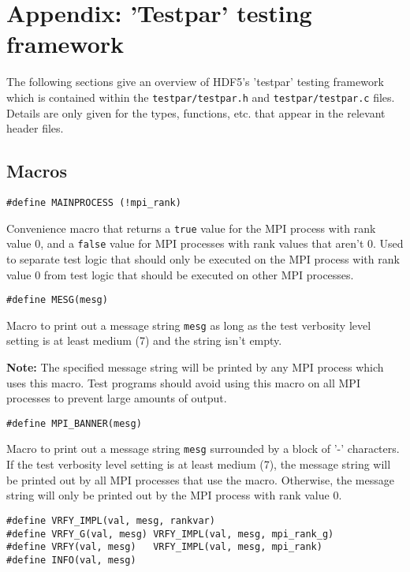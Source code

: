 \documentclass[../HDF5_RFC.tex]{subfiles}
\begin{document}
\newpage

\section{Appendix: 'Testpar' testing framework}
\label{apdx:testpar}

The following sections give an overview of HDF5's 'testpar' testing framework which is contained
within the \texttt{testpar/testpar.h} and \texttt{testpar/testpar.c} files. Details are only given
for the types, functions, etc. that appear in the relevant header files.

\subsection{Macros}

\begin{verbatim}
#define MAINPROCESS (!mpi_rank)
\end{verbatim}

Convenience macro that returns a \texttt{true} value for the MPI process with rank value 0, and a
\texttt{false} value for MPI processes with rank values that aren't 0. Used to separate test logic
that should only be executed on the MPI process with rank value 0 from test logic that should be
executed on other MPI processes.

\begin{verbatim}
#define MESG(mesg)
\end{verbatim}

Macro to print out a message string \texttt{mesg} as long as the test verbosity level setting is at least medium (7) and the string isn't empty.

\textbf{Note:} The specified message string will be printed by any MPI process which uses this macro.
Test programs should avoid using this macro on all MPI processes to prevent large amounts of output.

\begin{verbatim}
#define MPI_BANNER(mesg)
\end{verbatim}

Macro to print out a message string \texttt{mesg} surrounded by a block of '-' characters. If the test
verbosity level setting is at least medium (7), the message string will be printed out by all MPI processes
that use the macro. Otherwise, the message string will only be printed out by the MPI process with rank
value 0.

\begin{verbatim}
#define VRFY_IMPL(val, mesg, rankvar)
#define VRFY_G(val, mesg) VRFY_IMPL(val, mesg, mpi_rank_g)
#define VRFY(val, mesg)   VRFY_IMPL(val, mesg, mpi_rank)
#define INFO(val, mesg)
\end{verbatim}
\end{document}
